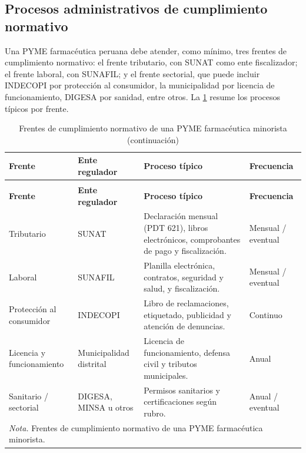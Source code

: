 \documentclass[12pt,a4paper,oneside]{report}
\begin{document}
\subsection{Procesos administrativos de cumplimiento normativo}\label{subsec:procesos-administrativos-cumplimiento}

Una PYME farmacéutica peruana debe atender, como mínimo, tres frentes de cumplimiento normativo: el frente tributario, con SUNAT como ente fiscalizador; el frente laboral, con SUNAFIL; y el frente sectorial, que puede incluir INDECOPI por protección al consumidor, la municipalidad por licencia de funcionamiento, DIGESA por sanidad, entre otros. La \cref{tab:frentes-cumplimiento-pyme} resume los procesos típicos por frente.

\begin{longtable}{@{}p{}p{}p{}p{}@{}}
\caption{Frentes de cumplimiento normativo de una PYME farmacéutica minorista}\label{tab:frentes-cumplimiento-pyme}\\
\toprule
\textbf{Frente} & \textbf{Ente regulador} & \textbf{Proceso típico} & \textbf{Frecuencia} \\
\midrule
\endfirsthead
\caption[]{Frentes de cumplimiento normativo de una PYME farmacéutica minorista (continuación)}\\
\toprule
\textbf{Frente} & \textbf{Ente regulador} & \textbf{Proceso típico} & \textbf{Frecuencia} \\
\midrule
\endhead
Tributario & SUNAT & Declaración mensual (PDT 621), libros electrónicos, comprobantes de pago y fiscalización. & Mensual / eventual \\
Laboral & SUNAFIL & Planilla electrónica, contratos, seguridad y salud, y fiscalización. & Mensual / eventual \\
Protección al consumidor & INDECOPI & Libro de reclamaciones, etiquetado, publicidad y atención de denuncias. & Continuo \\
Licencia y funcionamiento & Municipalidad distrital & Licencia de funcionamiento, defensa civil y tributos municipales. & Anual \\
Sanitario / sectorial & DIGESA, MINSA u otros & Permisos sanitarios y certificaciones según rubro. & Anual / eventual \\
\bottomrule
\multicolumn{4}{p{0.96\textwidth}}{\normalsize \textit{Nota.} Frentes de cumplimiento normativo de una PYME farmacéutica minorista.}\\
\end{longtable}
\end{document}
